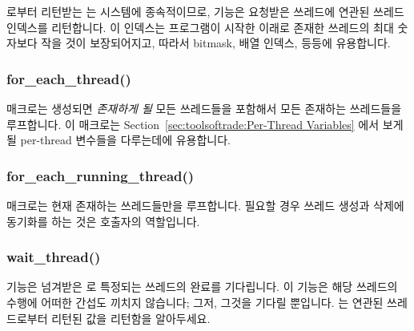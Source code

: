  로부터 리턴받는  는 시스템에 종속적이므로,
 기능은 요청받은 쓰레드에 연관된 쓰레드 인덱스를
리턴합니다.
이 인덱스는 프로그램이 시작한 이래로 존재한 쓰레드의 최대 숫자보다 작을 것이
보장되어지고, 따라서 bitmask, 배열 인덱스, 등등에 유용합니다.

\subsubsection{for\_each\_thread()}

 매크로는 생성되면 \emph{존재하게 될} 모든 쓰레드들을
포함해서 모든 존재하는 쓰레드들을 루프합니다.
이 매크로는 Section~\ref{sec:toolsoftrade:Per-Thread Variables} 에서 보게 될
per-thread 변수들을 다루는데에 유용합니다.

\subsubsection{for\_each\_running\_thread()}

 매크로는 현재 존재하는 쓰레드들만을 루프합니다.
필요할 경우 쓰레드 생성과 삭제에 동기화를 하는 것은 호출자의 역할입니다.

\subsubsection{wait\_thread()}

 기능은 넘겨받은  로 특정되는 쓰레드의 완료를
기다립니다.
이 기능은 해당 쓰레드의 수행에 어떠한 간섭도 끼치지 않습니다; 그저, 그것을
기다릴 뿐입니다.
 는 연관된 쓰레드로부터 리턴된 값을 리턴함을 알아두세요.
\iffalse

